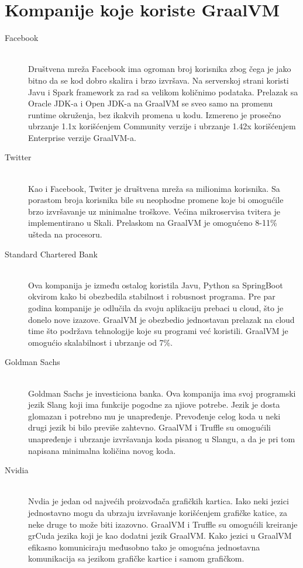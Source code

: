 \documentclass[a4paper]{article}
\begin{document}
\section{Kompanije koje koriste GraalVM}
\begin{description}
	\item[Facebook] \hfill \\
	Društvena mreža Facebook ima ogroman broj korisnika zbog čega je jako bitno da se kod dobro skalira i brzo izvršava.
	Na serverskoj strani koristi Javu i Spark framework za rad sa velikom količnimo podataka. Prelazak sa Oracle JDK-a i Open JDK-a na GraalVM se sveo samo na promenu runtime okruženja, bez ikakvih promena u kodu. Izmereno je prosečno ubrzanje 1.1x korišćenjem Community verzije i ubrzanje 1.42x korišćenjem Enterprise verzije GraalVM-a.
	
	\item[Twitter] \hfill \\
	Kao i Facebook, Twiter je društvena mreža sa milionima korisnika. Sa porastom broja korisnika bile su neophodne promene koje bi omogućile brzo izvršavanje uz minimalne troškove. Većina mikroservisa tvitera je implementirano u Skali. Prelaskom na GraalVM je omogućeno 8-11\% ušteda na procesoru. 
	
	
	\item[Standard Chartered Bank] \hfil \\
	Ova kompanija je između ostalog koristila Javu, Python sa SpringBoot okvirom kako bi obezbedila stabilnost i robusnost programa. Pre par godina kompanije je odlučila da svoju aplikaciju prebaci u cloud, što je donelo nove izazove. GraalVM je obezbedio jednostavan prelazak na cloud time što podržava tehnologije koje su programi već koristili. GraalVM je omogućio skalabilnost i ubrzanje od 7\%.
	
	\item[Goldman Sachs]  \hfil \\
	Goldman Sachs je investiciona banka. Ova kompanija ima svoj programski jezik Slang koji ima funkcije pogodne za njiove potrebe. Jezik je dosta glomazan i potrebno mu je unapređenje. Prevođenje celog koda u neki drugi jezik bi bilo previše zahtevno. GraalVM i Truffle su omogućili unapređenje i ubrzanje izvršavanja koda pisanog u Slangu, a da je pri tom napisana minimalna količina novog koda.
	
	\item[Nvidia]  \hfil \\
	Nvdia je jedan od najvećih proizvođača grafičkih kartica. Iako neki jezici jednostavno mogu da ubrzaju izvršavanje korišćenjem grafičke katice, za neke druge to može biti izazovno. GraalVM i Truffle su omogućili kreiranje grCuda jezika koji je kao dodatni jezik GraalVM. Kako jezici u GraalVM efikasno komuniciraju međusobno tako je omogućna jednostavna komunikacija sa jezikom grafičke kartice i samom grafičkom.
	

\end{description}
\end{document}
